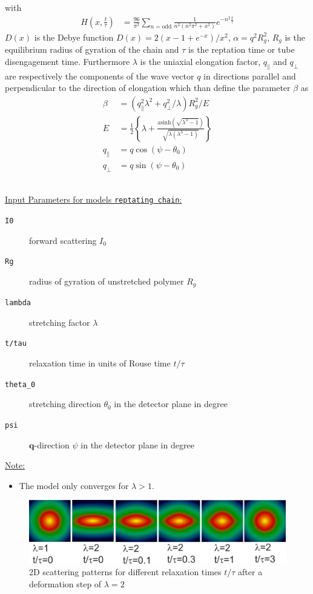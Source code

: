 with
\begin{align}
H\left(x,\frac{t}{\tau}\right) &= \frac{96}{\pi^2} \sum_{n = \mathrm{odd}} \frac{1}{n^2\left(n^2\pi^2+x^2\right)} e^{-n^2 \frac{t}{\tau}}
\end{align}
$D(x)$ is the Debye function $D(x) = 2\left(x - 1 + e^{-x}\right)/x^2$, $\alpha = q^2 R_g^2$, $R_g$ is the equilibrium radius of gyration
of the chain and $\tau$ is the reptation time or tube disengagement time.
Furthermore $\lambda$ is the uniaxial elongation factor, $q_\parallel$ and $q_\perp$ are respectively the components of the wave vector $q$ in directions parallel and
perpendicular to the direction of elongation which than define the parameter $\beta$ as
\begin{align}
\beta &= \left(q_\parallel^2\lambda^2+q_\perp^2/\lambda\right) R_g^2/E \\
E &= \frac{1}{2} \left\{\lambda +\frac{\mathrm{asinh}\left(\sqrt{\lambda^3-1}\right)}{\sqrt{\lambda\left(\lambda^3-1\right)}} \right\} \\
q_\parallel &= q \cos(\psi-\theta_0) \\
q_\perp &= q \sin(\psi-\theta_0)
\end{align}

\hspace{1pt}\\
\uline{Input Parameters for models \texttt{reptating chain}:}\\
\begin{description}
\item[\texttt{I0}] forward scattering $I_0$
\item[\texttt{Rg}] radius of gyration of unstretched polymer $R_g$
\item[\texttt{lambda}] stretching factor $\lambda$
\item[\texttt{t/tau}] relaxation time in units of Rouse time $t/\tau$
\item[\texttt{theta\_0}] stretching direction $\theta_0$ in the detector plane in degree
\item[\texttt{psi}] $\mathbf{q}$-direction $\psi$ in the detector plane in degree
\end{description}

\uline{Note:}
\begin{itemize}
\item The model only converges for $\lambda >1$.
\end{itemize}

\begin{figure}[htb]
\begin{center}
\includegraphics[width=\textwidth]{../images/form_factor/reptating_chain/lambda_2_reptating_chains.png}
\end{center}
\caption{2D scattering patterns for different relaxation times $t/\tau$ after a deformation step of $\lambda=2$}
\label{fig:IQ2Dstretchedpolymermelt}
\end{figure}


